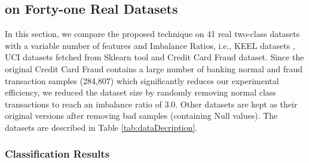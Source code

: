 \subsection{\Methodname{} on Forty-one Real Datasets}
\label{subsec:41Datasets}
In this section, we compare the proposed technique on 41 real two-class datasets with a variable number of features and Imbalance Ratios, i.e., KEEL datasets \cite{ KEEL_detail,KEEL_dataset}, UCI datasets fetched from Sklearn tool \cite{imbalancedlearnFetch_datasetsx2014, uci_imbalance_dataset} and Credit Card Fraud \cite{kaggleCreditCard} dataset. Since the original Credit Card Fraud contains a large number of banking normal and fraud transaction samples (284,807) which significantly reduces our experimental efficiency, we reduced the dataset size by randomly removing normal class transactions to reach an imbalance ratio of 3.0. Other datasets are kept as their original versions after removing bad samples (containing Null values). The datasets are described in Table \ref{tab:dataDecription}. 

\subsubsection{Classification Results}
\label{sec:classificationResult}

